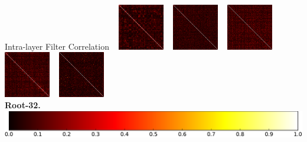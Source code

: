 \documentclass[t,xcolor=dvipsnames]{beamer}
\begin{document}
\begin{frame}[fragile]{Intra-layer Filter Correlation}
~
    \includegraphics[width=0.15\textwidth]{../Figs/Raster/ninroot32/corrcoef_conv4.png}
~
    \includegraphics[width=0.15\textwidth]{../Figs/Raster/ninroot32/corrcoef_conv5.png}
~
    \includegraphics[width=0.15\textwidth]{../Figs/Raster/ninroot32/corrcoef_conv6.png}
~
    \includegraphics[width=0.15\textwidth]{../Figs/Raster/ninroot32/corrcoef_conv8.png}
~
    \includegraphics[width=0.15\textwidth]{../Figs/Raster/ninroot32/corrcoef_conv9.png}\\
\textbf{Root-32.}\\
\includegraphics[width=0.4\linewidth]{../Figs/PDF/colorbar}
\end{frame}


\renewcommand{\covarlabels}[5]{%
\begin{tikzpicture}[anchor=south west]
    \node [inner sep=0pt] (c)
    {
        #5
    };
    \ifx\covarwidth\undefined
    \newlength{\covarwidth}
    \newlength{\covarheight}
    \fi
    \settowidth{\covarwidth}{#5}
    \settoheight{\covarheight}{#5}
    \path[use as bounding box] (c.south west) rectangle (c.north east);
    \node [anchor=south west, xshift=-0.5em, yshift=-0.5em, rotate=45] at (c.north west) {\footnotesize 0};
    \node [anchor=south east, xshift=\covarwidth, yshift=-0.2em] at (c.north west) {\footnotesize #4};
    \node [anchor=south west, xshift=0.25em, yshift=-1.05\covarheight, rotate=90] at (c.north west) {\footnotesize #2};
    \node [anchor=south, xshift=0.5\covarwidth] at (c.north west) {\footnotesize\texttt{#3}};
    \node [anchor=south, xshift=0.2em, yshift=-0.5\covarheight, rotate=90] at (c.north west) {\footnotesize \texttt{#1}};
\end{tikzpicture}%
}
\end{document}
